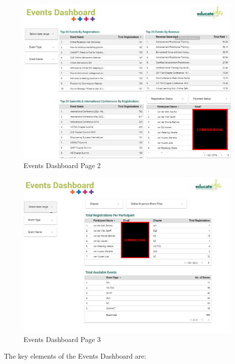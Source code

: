 \documentclass[11pt,a4paper,]{article}
\begin{document}
\begin{figure}[H]

{\centering \includegraphics[width=0.9\linewidth]{Images/events_dashboard_page_2} 

}

\caption{Events Dashboard Page 2}\label{fig:events-2}
\end{figure}

\begin{figure}[H]

{\centering \includegraphics[width=0.9\linewidth]{Images/events_dashboard_page_3} 

}

\caption{Events Dashboard Page 3}\label{fig:events-3}
\end{figure}

The key elements of the Events Dashboard are:
\end{document}
